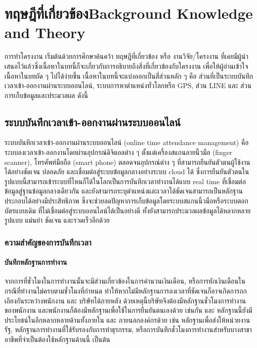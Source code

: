 \chapter{\ifcpe ทฤษฎีที่เกี่ยวข้อง\else Background Knowledge and Theory\fi}

\quad การทำโครงงาน เริ่มต้นด้วยการศึกษาค้นคว้า ทฤษฎีที่เกี่ยวข้อง หรือ งานวิจัย/โครงงาน ที่เคยมีผู้นําเสนอไว้แล้วซึ่งเนื้อหาในบทนี้ก็จะเกี่ยวกับการอธิบายถึงสิ่งที่เกี่ยวข้องกับโครงงาน เพื่อให้ผู้อ่านเข้าใจเนื้อหาในบทถัด ๆ ไปได้ง่ายขึ้น เนื้อหาในบทนี้จะแบ่งออกเป็นสี่ส่วนหลัก ๆ คือ ส่วนที่เป็นระบบบันทึกเวลาเข้า-ออกงานผ่านระบบออนไลน์, ระบบการหาตำแหน่งทั่วโลกหรือ GPS, ส่วน LINE และ ส่วนการเก็บข้อมูลและประมวลผล ดังนี้ 

\section{ระบบบันทึกเวลาเข้า-ออกงานผ่านระบบออนไลน์}
\quad ระบบบันทึกเวลาเข้า-ออกงานผ่านระบบออนไลน์ (online time attendance management) คือ 
ระบบลงเวลาเข้า-ออกงานโดยผ่านอุปกรณ์ดิจิตอลต่าง ๆ ตั้งแต่เครื่องสแกนลายนิ้วมือ (finger scanner), โทรศัพท์มือถือ (smart phone) ตลอดจนอุปกรณ์ต่าง ๆ ที่สามารถยืนยันตัวตนผู้ใช้งานได้อย่างชัดเจน ปลอดภัย และเชื่อมต่อสู่ระบบข้อมูลกลางอย่างระบบ cloud ได้ ซึ่งการยืนยันตัวตนในรูปแบบนี้สามารถเข้าระบบที่ไหนก็ได้ในโลกเป็นการบันทึกเวลาทำงานได้แบบ real time ที่เชื่อมต่อข้อมูลสู่ฐานข้อมูลกลางเดียวกัน และยังสามารถระบุตำแหน่งและเวลาได้ชัดเจนสามารถเป็นหลักฐานประกอบได้อย่างมีประสิทธิภาพ ซึ่งจะช่วยลดปัญหาการเก็บข้อมูลโดยระบบสแกนนิ้วมือหรือระบบตอกบัตรแบบเดิม ที่ไม่เชื่อมต่อสู่ระบบออนไลน์ได้เป็นอย่างดี ทั้งยังสามารถประมวลผลข้อมูลได้หลากหลายรูปแบบ แม่นยํา ชัดเจน และรวดเร็วอีกด้วย

\subsection{ความสำคัญของการบันทึกเวลา}
\subsubsection{บันทึกหลักฐานการทำงาน}
\quad จากการที่ชั่วโมงในการทำงานนั้นจะมีส่วนเกี่ยวข้องในการคำนวนเงินเดือน, หรือการหักเงินเดือนในกรณีที่ทำงานไม่ครบตามชั่วโมงที่กำหนด 
ทำให้หากไม่มีหลักฐานการลงเวลาที่ชัดเจนก็อาจเกิดการถกเถียงกันระหว่างพนักงาน และ บริษัทได้ภายหลัง ด้วยเหตุนี้บริษัทจึงต้องมีหลักฐานชั่วโมงการทำงานของพนักงาน และพนักงานก็ต้องมีหลักฐานเพื่อใช้ในการยืนยันตนเองด้วย เช่นกัน
และ หลักฐานนี้ยังมีประโยชน์ในอีกหลากหลายด้านทั้งภายใน และ ภายนอกองค์กรด้วย เช่น 
หลักฐานเพื่อส่งให้หน่วยงานรัฐ, หลักฐานการทำงานที่ใช้รับรองกับการทำธุรกรรม, หรือการบันทึกชั่วโมงการทำงานสำหรับบางสาขาอาชีพที่จำเป็นต้องใช้หลักฐานด้านนี้ เป็นต้น 
